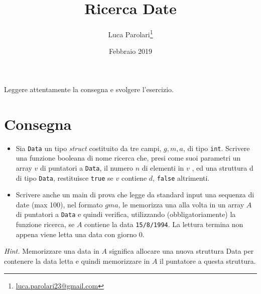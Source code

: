 \documentclass[addpoints,12pt,answers]{exam}
\author{Luca Parolari\footnote{\href{mailto:luca.parolari23@gmail.com}{luca.parolari23@gmail.com}}}
\begin{document}
    
    \title{Ricerca Date}
    \date{Febbraio 2019}
    
    \maketitle
    
    Leggere attentamente la consegna e svolgere l'esercizio.
    
    \section{Consegna}
    
    \begin{itemize}
    	\item Sia \texttt{Data} un tipo \emph{struct} costituito da tre campi, $g, m, a$, di tipo \texttt{int}. Scrivere una funzione booleana di nome ricerca che, presi come suoi parametri un array $v$ di puntatori a \texttt{Data}, il numero $n$ di elementi in $v$ , ed una struttura d di tipo \texttt{Data}, restituisce \texttt{true} se $v$ contiene $d$, \texttt{false} altrimenti.
    	\item Scrivere anche un main di prova che legge da standard input una sequenza di date (max 100), nel formato $g m a$, le memorizza una alla volta in un array $A$ di puntatori a \texttt{Data} e quindi verifica, utilizzando (obbligatoriamente) la funzione ricerca, se $A$ contiene la data \texttt{15/8/1994}. La lettura termina non appena viene letta una data con giorno 0.
    \end{itemize}

	\emph{Hint.} Memorizzare una data in $A$ significa allocare una nuova struttura Data per contenere la data letta e quindi memorizzare in $A$ il puntatore a questa struttura.
    
\end{document}
